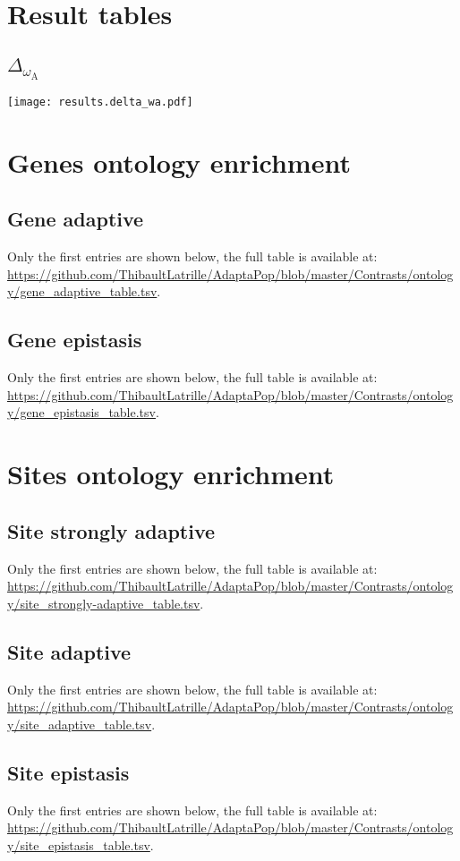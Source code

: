 \documentclass{article}
\begin{document}
\section{Result tables}

\subsection{$\Delta_{\omega_{\text{A}}}$}
\texttt{[image: results.delta\_wa.pdf]}

\tiny



\section{Genes ontology enrichment}

\subsection{Gene adaptive}
Only the first entries are shown below, the full table is available at:
\url{https://github.com/ThibaultLatrille/AdaptaPop/blob/master/Contrasts/ontology/gene_adaptive_table.tsv}.


\subsection{Gene epistasis}
Only the first entries are shown below, the full table is available at:
\url{https://github.com/ThibaultLatrille/AdaptaPop/blob/master/Contrasts/ontology/gene_epistasis_table.tsv}.



\section{Sites ontology enrichment}

\subsection{Site strongly adaptive}
Only the first entries are shown below, the full table is available at:
\url{https://github.com/ThibaultLatrille/AdaptaPop/blob/master/Contrasts/ontology/site_strongly-adaptive_table.tsv}.


\subsection{Site adaptive}
Only the first entries are shown below, the full table is available at:
\url{https://github.com/ThibaultLatrille/AdaptaPop/blob/master/Contrasts/ontology/site_adaptive_table.tsv}.


\subsection{Site epistasis}
Only the first entries are shown below, the full table is available at:
\url{https://github.com/ThibaultLatrille/AdaptaPop/blob/master/Contrasts/ontology/site_epistasis_table.tsv}.

\end{document}
